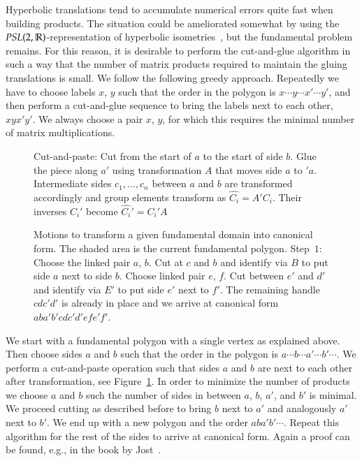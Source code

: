 \documentclass[Thesis]{subfiles}
\begin{document}
Hyperbolic translations tend to accumulate numerical errors quite fast when
building products. The situation could be ameliorated somewhat by using
the $PSL(2,\mathbb R)$-representation of hyperbolic
isometries~\cite{Floyd2002}, but the fundamental problem remains. For
this reason, it is desirable to perform the cut-and-glue algorithm in
such a way that the number of matrix products required to maintain the
gluing translations is small. We follow the following greedy
approach. Repeatedly we have to choose labels $x$, $y$ such that the
order in the polygon is $x\cdots y\cdots x'\cdots y'$, and then
perform a cut-and-glue sequence to bring the labels next to each
other, $xyx'y'$. We always choose a pair $x$, $y$, for which this
requires the minimal number of matrix multiplications.


\begin{figure}
\centering
\resizebox{0.4\textwidth}{!} {

}
\caption{Cut-and-paste: Cut from the start of $a$ to the start of side $b$. Glue the piece along $a'$ using transformation $A$ that moves side $a$ to $'a$. Intermediate sides $c_1,\ldots,c_n$ between $a$ and $b$ are transformed accordingly and group elements transform as $\hat{C_i}=A'C_i$. Their inverses $C_i'$ become $\hat{C_i}'=C_i'A$}
\label{fig:cut-and-paste-canonical}
\end{figure}

 \begin{figure}
 \centering
 \caption{Motions to transform a given fundamental domain into canonical form. The shaded area is the current fundamental polygon. Step~$1$: Choose the linked pair $a$, $b$. Cut at $c$ and $b$ and identify via $B$ to put side $a$ next to side $b$. Choose linked pair $e$, $f$. Cut between $e'$ and $d'$ and identify via $E'$ to put side $e'$ next to $f'$. The remaining handle $cdc'd'$ is already in place and we arrive at canonical form $aba'b'cdc'd'efe'f'$.}
 \label{fig:canonical_algorithm}
 \end{figure}

 We start with a fundamental polygon with a single vertex as explained above. 
 Then choose sides $a$ and $b$ such that the order in the polygon is $a\cdots b \cdots a' \cdots b' \cdots$. 
 We perform a cut-and-paste operation such that sides $a$ and $b$ are next to each other after transformation, see Figure~\ref{fig:cut-and-paste-canonical}. 
 In order to minimize the number of products we choose $a$ and $b$ such the number of sides in between $a$, $b$, $a'$, and $b'$ is minimal. 
 We proceed cutting as described before to bring $b$ next to $a'$ and analogously $a'$ next to $b'$. 
 We end up with a new polygon and the order $aba'b'\cdots$. 
 Repeat this algorithm for the rest of the sides to arrive at canonical form. 
 Again a proof can be found, e.g., in the book by Jost~\cite[p. 51]{Jost2007}.
\end{document}
